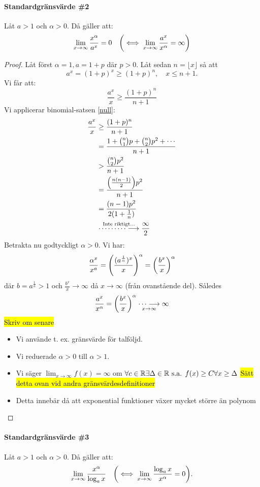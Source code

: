 \paragraph{Standardgränsvärde \#2}
Låt $a>1$ och $\alpha>0$. Då gäller att:
$$
	\lim_{x\to\infty}\frac{x^\alpha}{a^x}=0\quad\qty(\iff\lim_{x\to\infty}\frac{a^x}{x^\alpha}=\infty)
$$
\begin{proof}
	Låt först $\alpha=1,a=1+p$ där $p>0$. Låt sedan $n=\lfloor x\rfloor$ så att
	$$
		a^x=(1+p)^x\geq(1+p)^n,\quad x\leq n+1.
	$$
	Vi får att:
	$$
		\frac{a^x}{x}\geq\frac{(1+p)^n}{n+1}
	$$
	Vi applicerar binomial-satsen \eqref{null}:
	\begin{align*}
		\frac{a^x}{x}&\geq\frac{(1+p)^n}{n+1}\\
		&=\frac{1+{n\choose 1}p+{n\choose 2}p^2+\cdots}{n+1}\\
		&>\frac{{n\choose 2}p^2}{n+1}\\
		&=\frac{\qty(\frac{n(n-1)}{2})p^2}{n+1}\\
		&=\frac{(n-1)p^2}{2(1+\frac{1}{n})}\\
		&\stackrel{\text{Inte riktigt...}}{\cdots\cdots\cdots\longrightarrow}\frac{\infty}{2}
	\end{align*}
	Betrakta nu godtyckligt $\alpha>0$. Vi har:
	$$
		\frac{\alpha^x}{x^a}=\qty(\frac{(a^\frac{1}{\alpha})^x}{x})^\alpha=\qty(\frac{b^x}{x})^\alpha
	$$
	där $b=a^\frac{1}{a}>1$ och $\frac{b^x}{x}\to\infty$ då $x\to\infty$ (från ovanstående del).
	Således
	$$
		\frac{a^x}{x^\alpha}=\qty(\frac{b^x}{x})^\alpha\underset{x\to\infty}{\cdots\longrightarrow}\infty
	$$
	\hl{Skriv om senare}
	\begin{itemize}
		\item Vi använde t. ex. gränsvärde för talföljd.
		\item Vi reduerade $\alpha>0$ till $\alpha>1$.
		\item Vi säger $\lim_{x\to\infty}f(x)=\infty$ om
		$\forall c\in\mathbb{R}\exists\Delta\in\mathbb{R}\text{ s.a. } f(x)\geq C\forall x\geq\Delta$
		\hl{Sätt detta ovan vid andra gränsvärdesdefinitioner}
		\item Detta innebär då att exponential funktioner växer mycket större än polynom
	\end{itemize}
\end{proof}

\paragraph{Standardgränsvärde \#3}
Låt $a>1$ och $\alpha>0$. Då gäller att:
$$
	\lim_{x\to\infty}\frac{x^\alpha}{\log_ax}\quad\qty(\iff\lim_{x\to\infty}\frac{\log_ax}{x^\alpha}=0).
$$

